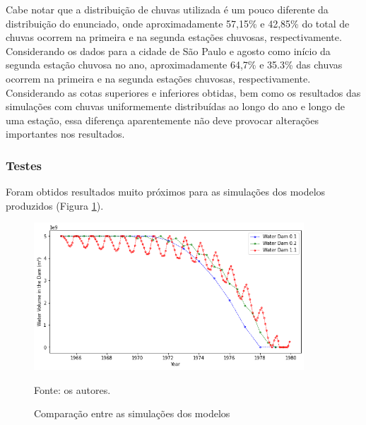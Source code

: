 \documentclass{article}
\begin{document}
Cabe notar que a distribuição de chuvas utilizada é um pouco diferente da distribuição do enunciado, onde aproximadamente 57,15\% e 42,85\% do total de chuvas ocorrem na primeira e na segunda estações chuvosas, respectivamente. Considerando os dados para a cidade de São Paulo e agosto como início da segunda estação chuvosa no ano, aproximadamente 64,7\% e 35.3\% das chuvas ocorrem na primeira e na segunda estações chuvosas, respectivamente. Considerando as cotas superiores e inferiores obtidas, bem como os resultados das simulações com chuvas uniformemente distribuídas ao longo do ano e longo de uma estação, essa diferença aparentemente não deve provocar alterações importantes nos resultados.

%
%
%
\subsubsection*{Testes}

Foram obtidos resultados muito próximos para as simulações dos modelos produzidos (Figura \ref{fig:comparacao_resultados}).

\begin{figure}[ht!]
    \centering
    \caption{Comparação entre as simulações dos modelos}
    \includegraphics[width=0.9\textwidth]{imagens/model_comp.png}
    \label{fig:comparacao_resultados}
    {\flushleft Fonte: os autores.\par}
\end{figure}
\end{document}
